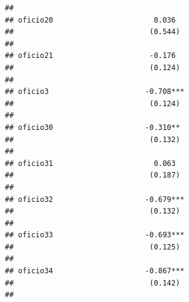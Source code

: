 \documentclass[
]{article}
\begin{document}
\begin{verbatim}
##                                                                                                     
## oficio20                       0.036                                                                
##                               (0.544)                                                               
##                                                                                                     
## oficio21                      -0.176                                                                
##                               (0.124)                                                               
##                                                                                                     
## oficio3                      -0.708***                                                              
##                               (0.124)                                                               
##                                                                                                     
## oficio30                     -0.310**                                                               
##                               (0.132)                                                               
##                                                                                                     
## oficio31                       0.063                                                                
##                               (0.187)                                                               
##                                                                                                     
## oficio32                     -0.679***                                                              
##                               (0.132)                                                               
##                                                                                                     
## oficio33                     -0.693***                                                              
##                               (0.125)                                                               
##                                                                                                     
## oficio34                     -0.867***                                                              
##                               (0.142)                                                               
##                                                                                                     

\end{verbatim}
\end{document}

